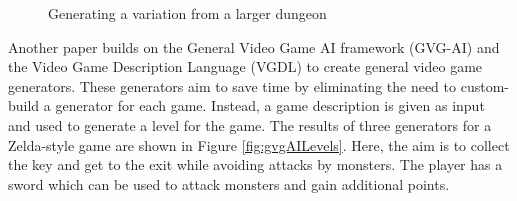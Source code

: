 \begin{figure}[H]
    \centering
    \hfill
    \caption{Generating a variation from a larger dungeon \cite{Graph_Constraint_Dungeon}}
    \label{fig:graphDungeon}
\end{figure}

Another paper \cite{GVG-AI_and_VGDL_Level_Generators} builds on the General Video Game AI framework (GVG-AI) and the Video Game Description Language (VGDL) to create general video game generators. These generators aim to save time by eliminating the need to custom-build a generator for each game. Instead, a game description is given as input and used to generate a level for the game. The results of three generators for a Zelda-style game are shown in Figure \ref{fig:gvgAILevels}. Here, the aim is to collect the key and get to the exit while avoiding attacks by monsters. The player has a sword which can be used to attack monsters and gain additional points.

